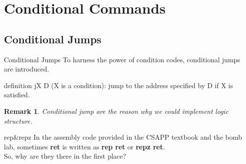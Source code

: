 \documentclass{beamer}
\newtheorem{rmk}{Remark}
\begin{document}
    \section{Conditional Commands}
        \subsection{Conditional Jumps}
        \begin{frame}{Conditional Jumps}
            To harness the power of condition codes, conditional jumps are introduced.
            \begin{block}{definition}
                jX D (X is a condition): jump to the address specified by D if X is satisfied.
            \end{block}
            \begin{rmk}
                Conditional jump are the reason why we could implement logic structure.
            \end{rmk}
        \end{frame}
        \begin{frame}{rep\&repz}
            In the assembly code provided in the CSAPP textbook and the bomb lab, sometimes \textbf{ret} is written as \textbf{rep ret} or \textbf{repz ret}.\\
            So, why are they there in the first place?
        \end{frame}
\end{document}
